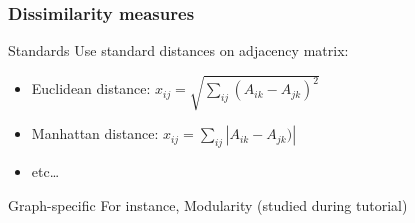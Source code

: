 \documentclass{beamer}\usepackage[]{graphicx}\usepackage[]{color}
\begin{document}
\begin{frame}
  \frametitle{Dissimilarity measures}

  \begin{block}{Standards}
    Use standard distances on adjacency matrix:
    \begin{itemize}
      \item Euclidean distance: $\displaystyle x_{ij} = \sqrt{\sum_{ij} (A_{ik} - A_{jk})^2} $
      \item Manhattan distance: $\displaystyle x_{ij} = \sum_{ij} |A_{ik} - A_{jk})| $
      \item  etc\dots
    \end{itemize}  
  \end{block}

  \vfill

  \begin{block}{Graph-specific}
    For instance,  Modularity (studied during tutorial)
  \end{block}
  
\end{frame}
\end{document}
